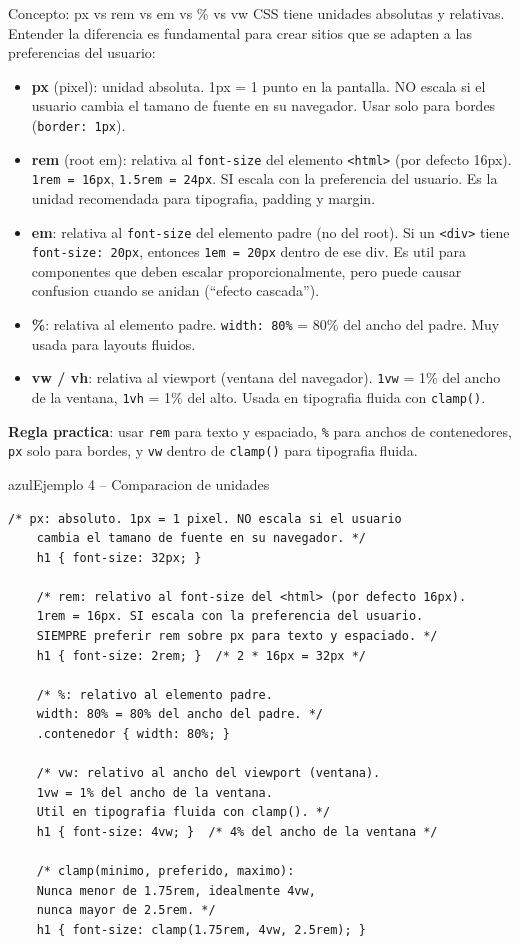 \documentclass[11pt,a4paper]{article}
\begin{document}
	\begin{cajaconcepto}{Concepto: px vs rem vs em vs \% vs vw}
		CSS tiene unidades absolutas y relativas. Entender la diferencia es fundamental para crear sitios que se adapten a las preferencias del usuario:
		
		\begin{itemize}[leftmargin=1.2em,itemsep=3pt]
			\item \textbf{px} (pixel): unidad absoluta. 1px = 1 punto en la pantalla. NO escala si el usuario cambia el tamano de fuente en su navegador. Usar solo para bordes (\texttt{border: 1px}).
			\item \textbf{rem} (root em): relativa al \texttt{font-size} del elemento \texttt{<html>} (por defecto 16px). \texttt{1rem = 16px}, \texttt{1.5rem = 24px}. SI escala con la preferencia del usuario. Es la unidad recomendada para tipografia, padding y margin.
			\item \textbf{em}: relativa al \texttt{font-size} del elemento padre (no del root). Si un \texttt{<div>} tiene \texttt{font-size: 20px}, entonces \texttt{1em = 20px} dentro de ese div. Es util para componentes que deben escalar proporcionalmente, pero puede causar confusion cuando se anidan (``efecto cascada'').
			\item \textbf{\%}: relativa al elemento padre. \texttt{width: 80\%} = 80\% del ancho del padre. Muy usada para layouts fluidos.
			\item \textbf{vw / vh}: relativa al viewport (ventana del navegador). \texttt{1vw} = 1\% del ancho de la ventana, \texttt{1vh} = 1\% del alto. Usada en tipografia fluida con \texttt{clamp()}.
		\end{itemize}
		
		\textbf{Regla practica}: usar \texttt{rem} para texto y espaciado, \texttt{\%} para anchos de contenedores, \texttt{px} solo para bordes, y \texttt{vw} dentro de \texttt{clamp()} para tipografia fluida.
	\end{cajaconcepto}
	
	\begin{cajacodigo}{azul}{Ejemplo 4 -- Comparacion de unidades}
		\begin{lstlisting}[style=codecss]
	/* px: absoluto. 1px = 1 pixel. NO escala si el usuario
	cambia el tamano de fuente en su navegador. */
	h1 { font-size: 32px; }
	
	/* rem: relativo al font-size del <html> (por defecto 16px).
	1rem = 16px. SI escala con la preferencia del usuario.
	SIEMPRE preferir rem sobre px para texto y espaciado. */
	h1 { font-size: 2rem; }  /* 2 * 16px = 32px */
	
	/* %: relativo al elemento padre.
	width: 80% = 80% del ancho del padre. */
	.contenedor { width: 80%; }
	
	/* vw: relativo al ancho del viewport (ventana).
	1vw = 1% del ancho de la ventana.
	Util en tipografia fluida con clamp(). */
	h1 { font-size: 4vw; }  /* 4% del ancho de la ventana */
	
	/* clamp(minimo, preferido, maximo):
	Nunca menor de 1.75rem, idealmente 4vw,
	nunca mayor de 2.5rem. */
	h1 { font-size: clamp(1.75rem, 4vw, 2.5rem); } \end{lstlisting}
	\end{cajacodigo}
	
\end{document}
